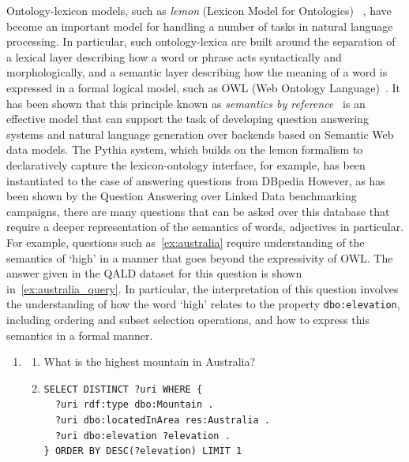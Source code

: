 \documentclass[11pt]{article}
\begin{document}
Ontology-lexicon models, such as \emph{lemon} (Lexicon Model for Ontologies)~
\cite{mccrae2012interchanging}, have become an important model for handling a 
number of tasks in natural language processing. In particular, such 
ontology-lexica are built around the separation of a lexical layer describing 
how a word or phrase acts syntactically and morphologically, and a semantic layer 
describing how the meaning of a word is expressed in a formal logical model, 
such as OWL (Web Ontology Language)~\cite{mcguinness2004owl}. It has been 
shown that this principle known as \emph{semantics by reference}~
\cite{buitelaar2010ontology} is an effective model that can support the task of developing
question answering systems \cite{unger2011pythia} and natural language 
generation \cite{cimiano2013exploiting} over backends based on Semantic Web data models.
The Pythia system, which builds on the lemon formalism to declaratively capture the lexicon-ontology interface, for example, has been instantiated to the case of answering questions from DBpedia \cite{unger2011pythia}
However, as has been 
shown by the Question Answering over Linked Data \cite[QALD]{lopez2013evaluating}
benchmarking campaigns, there are many questions that can be asked over this database that require 
a deeper representation of the semantics of words, adjectives in particular. For example, 
questions such as~\ref{ex:australia} require understanding of the semantics of `high' in a manner that goes beyond the expressivity of OWL. The answer given 
in the QALD dataset for this question is shown in~\ref{ex:australia_query}. 
In particular, the interpretation of this question involves the understanding of 
how the word `high' relates to the property {\tt dbo:elevation}, including ordering 
and subset selection operations, and how to express this semantics in a formal manner.

\begin{enumerate}
\item \begin{enumerate} 
\item What is the highest mountain in Australia? \label{ex:australia}
\item \begin{verbatim}
SELECT DISTINCT ?uri WHERE { 
  ?uri rdf:type dbo:Mountain . 
  ?uri dbo:locatedInArea res:Australia . 
  ?uri dbo:elevation ?elevation . 
} ORDER BY DESC(?elevation) LIMIT 1
\end{verbatim} 
\label{ex:australia_query}
\end{enumerate}
\end{enumerate}
\end{document}
